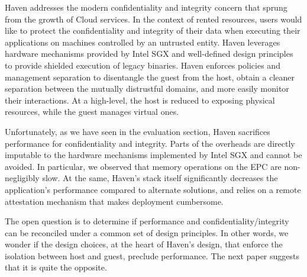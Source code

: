 %
Haven addresses the modern confidentiality and integrity concern that sprung from the growth of Cloud services.
In the context of rented resources, users would like to protect the confidentiality and integrity of their data when executing their applications on machines controlled by an untrusted entity.
Haven leverages hardware mechanisms provided by Intel SGX and well-defined design principles to provide shielded execution of legacy binaries.
Haven enforces policies and management separation to disentangle the guest from the host, obtain a cleaner separation between the mutually distrustful domains, and more easily monitor their interactions.
At a high-level, the host is reduced to exposing physical resources, while the guest manages virtual ones.

Unfortunately, as we have seen in the evaluation section, Haven sacrifices performance for confidentiality and integrity.
Parts of the overheads are directly imputable to the hardware mechanisms implemented by Intel SGX and cannot be avoided.
In particular, we observed that memory operations on the EPC are non-negligibly slow.
At the same, Haven's stack itself significantly decreases the application's performance compared to alternate solutions, and relies on a remote attestation mechanism that makes deployment cumbersome.

The open question is to determine if performance and confidentiality/integrity can be reconciled under a common set of design principles.
In other words, we wonder if the design choices, at the heart of Haven's design, that enforce the isolation between host and guest, preclude performance.
The next paper suggests that it is quite the opposite.